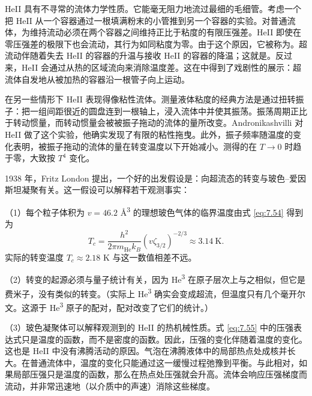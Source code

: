 


HeII 具有不寻常的流体力学性质。它能毫无阻力地流过最细的毛细管。考虑一个把 HeII 从一个容器通过一根填满粉末的小管推到另一个容器的实验。对普通流体，为维持流动必须在两个容器之间维持正比于粘度的有限压强差。HeII 即使在零压强差的极限下也会流动，其行为如同粘度为零。由于这个原因，它被称为。超流动伴随着失去 HeII 的容器的升温与接收 HeII 的容器的降温；这就是。反过来，HeII 会通过从热的区域流向来消除温度差。这在中得到了戏剧性的展示：超流体自发地从被加热的容器沿一根管子向上运动。


在另一些情形下 HeII 表现得像粘性流体。测量液体粘度的经典方法是通过扭转振子：把一组间距很近的圆盘连到一根轴上，浸入流体中并使其振荡。振荡周期正比于转动惯量，而转动惯量会被被振子拖动的流体的量所改变。Andronikashvilli 对 HeII 做了这个实验，他确实发现了有限的粘性拖曳。此外，振子频率随温度的变化表明，被振子拖动的流体的量在转变温度以下开始减小。测得的在 $T\to0$ 时趋于零，大致按 $T^4$ 变化。

1938 年，Fritz London 提出，一个好的出发假设是：向超流态的转变与玻色--爱因斯坦凝聚有关。这一假设可以解释若干观测事实：



（1）每个粒子体积为 $v=46.2$ \AA\textsuperscript{3} 的理想玻色气体的临界温度由式 \eqref{eq:7.54} 得到为
\begin{equation}\label{eq:7.67}
T_c=\frac{h^2}{2\pi m_{\text{He}}k_B}\left(v\zeta_{3/2}\right)^{-2/3}\approx3.14\ \text{K}.
\end{equation}
实际的转变温度 $T_c\approx2.18$ K 与这一数值相差不远。

（2）转变的起源必须与量子统计有关，因为 He\textsuperscript{3} 在原子层次上与之相似，但它是费米子，没有类似的转变。（实际上 He\textsuperscript{3} 确实会变成超流，但温度只有几个毫开尔文。这源于 He\textsuperscript{3} 原子的配对，配对改变了它们的统计。）

（3）玻色凝聚体可以解释观测到的 HeII 的热机械性质。式 \eqref{eq:7.55} 中的压强表达式只是温度的函数，而不是密度的函数。因此，压强的变化伴随着温度的变化。这也是 HeII 中没有沸腾活动的原因。气泡在沸腾液体中的局部热点处成核并长大。在普通流体中，温度的变化只能通过这一缓慢过程弛豫到平衡。与此相对，如果局部压强只是温度的函数，那么在热点处压强就会升高。流体会响应压强梯度而流动，并非常迅速地（以介质中的声速）消除这些梯度。

